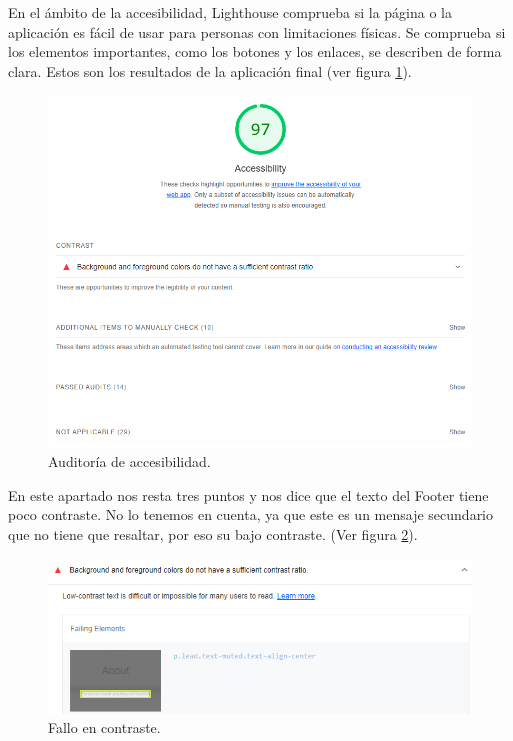 \documentclass[12pt,twoside,titlepage]{report}
\begin{document}
En el ámbito de la accesibilidad, Lighthouse comprueba si la página o la aplicación es fácil de usar para personas con limitaciones físicas. Se comprueba si los elementos importantes, como los botones y los enlaces, se describen de forma clara. Estos son los resultados de la aplicación final (ver figura \ref{fig:Lighthouse_accesibility}).

\begin{figure}[H]
    \centering
    \includegraphics[scale=0.6]{Lighthouse/Accesibility}
    \caption{Auditoría de accesibilidad.}
    \label{fig:Lighthouse_accesibility}
\end{figure}

En este apartado nos resta tres puntos y nos dice que el texto del Footer tiene poco contraste. No lo tenemos en cuenta, ya que este es un mensaje secundario que no tiene que resaltar, por eso su bajo contraste. (Ver figura \ref{fig:Lighthouse_contrast}).

\begin{figure}[H]
    \centering
    \includegraphics[scale=0.6]{Lighthouse/AccesibilityContrast}
    \caption{Fallo en contraste.}
    \label{fig:Lighthouse_contrast}
\end{figure}
\end{document}

